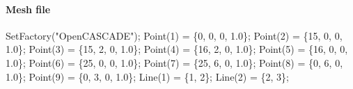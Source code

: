 \documentclass[11pt]{article}
\newenvironment{Shaded}{}{}
\newcommand{\DecValTok}[1]{\textcolor[rgb]{0.25,0.63,0.44}{{#1}}}
\newcommand{\FloatTok}[1]{\textcolor[rgb]{0.25,0.63,0.44}{{#1}}}
\newcommand{\StringTok}[1]{\textcolor[rgb]{0.25,0.44,0.63}{{#1}}}
\newcommand{\NormalTok}[1]{{#1}}
\newcommand{\OperatorTok}[1]{\textcolor[rgb]{0.40,0.40,0.40}{{#1}}}
\begin{document}
\hypertarget{mesh-file-2}{%
\paragraph{Mesh file}\label{mesh-file-2}}

\begin{Shaded}
\begin{Highlighting}[]
\NormalTok{SetFactory}\OperatorTok{(}\StringTok{"OpenCASCADE"}\OperatorTok{);}
\NormalTok{Point}\OperatorTok{(}\DecValTok{1}\OperatorTok{)} \OperatorTok{=} \OperatorTok{\{}\DecValTok{0}\OperatorTok{,} \DecValTok{0}\OperatorTok{,} \DecValTok{0}\OperatorTok{,} \FloatTok{1.0}\OperatorTok{\};}
\NormalTok{Point}\OperatorTok{(}\DecValTok{2}\OperatorTok{)} \OperatorTok{=} \OperatorTok{\{}\DecValTok{15}\OperatorTok{,} \DecValTok{0}\OperatorTok{,} \DecValTok{0}\OperatorTok{,} \FloatTok{1.0}\OperatorTok{\};}
\NormalTok{Point}\OperatorTok{(}\DecValTok{3}\OperatorTok{)} \OperatorTok{=} \OperatorTok{\{}\DecValTok{15}\OperatorTok{,} \DecValTok{2}\OperatorTok{,} \DecValTok{0}\OperatorTok{,} \FloatTok{1.0}\OperatorTok{\};}
\NormalTok{Point}\OperatorTok{(}\DecValTok{4}\OperatorTok{)} \OperatorTok{=} \OperatorTok{\{}\DecValTok{16}\OperatorTok{,} \DecValTok{2}\OperatorTok{,} \DecValTok{0}\OperatorTok{,} \FloatTok{1.0}\OperatorTok{\};}
\NormalTok{Point}\OperatorTok{(}\DecValTok{5}\OperatorTok{)} \OperatorTok{=} \OperatorTok{\{}\DecValTok{16}\OperatorTok{,} \DecValTok{0}\OperatorTok{,} \DecValTok{0}\OperatorTok{,} \FloatTok{1.0}\OperatorTok{\};}
\NormalTok{Point}\OperatorTok{(}\DecValTok{6}\OperatorTok{)} \OperatorTok{=} \OperatorTok{\{}\DecValTok{25}\OperatorTok{,} \DecValTok{0}\OperatorTok{,} \DecValTok{0}\OperatorTok{,} \FloatTok{1.0}\OperatorTok{\};}
\NormalTok{Point}\OperatorTok{(}\DecValTok{7}\OperatorTok{)} \OperatorTok{=} \OperatorTok{\{}\DecValTok{25}\OperatorTok{,} \DecValTok{6}\OperatorTok{,} \DecValTok{0}\OperatorTok{,} \FloatTok{1.0}\OperatorTok{\};}
\NormalTok{Point}\OperatorTok{(}\DecValTok{8}\OperatorTok{)} \OperatorTok{=} \OperatorTok{\{}\DecValTok{0}\OperatorTok{,} \DecValTok{6}\OperatorTok{,} \DecValTok{0}\OperatorTok{,} \FloatTok{1.0}\OperatorTok{\};}
\NormalTok{Point}\OperatorTok{(}\DecValTok{9}\OperatorTok{)} \OperatorTok{=} \OperatorTok{\{}\DecValTok{0}\OperatorTok{,} \DecValTok{3}\OperatorTok{,} \DecValTok{0}\OperatorTok{,} \FloatTok{1.0}\OperatorTok{\};}
\NormalTok{Line}\OperatorTok{(}\DecValTok{1}\OperatorTok{)} \OperatorTok{=} \OperatorTok{\{}\DecValTok{1}\OperatorTok{,} \DecValTok{2}\OperatorTok{\};}
\NormalTok{Line}\OperatorTok{(}\DecValTok{2}\OperatorTok{)} \OperatorTok{=} \OperatorTok{\{}\DecValTok{2}\OperatorTok{,} \DecValTok{3}\OperatorTok{\};}

\end{Highlighting}
\end{Shaded}
\end{document}
